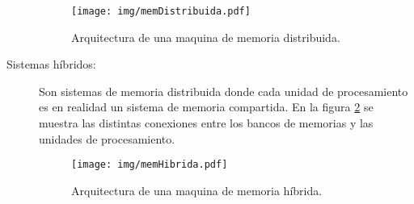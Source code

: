 \begin{description}
\begin{figure}[!htb]

	\centering
	\texttt{[image: img/memDistribuida.pdf]}
	\caption{Arquitectura de una maquina de memoria distribuida.}

	\label{memDistribuida}

\end{figure}


	\item[Sistemas híbridos:] Son sistemas de memoria distribuida donde
		cada unidad de procesamiento es en realidad un sistema de
		memoria compartida. En la figura \ref{memHibrida} se muestra las
		distintas conexiones entre los bancos de memorias y las unidades
		de procesamiento.

\begin{figure}[!htb]

	\centering
	\texttt{[image: img/memHibrida.pdf]}
	\caption{Arquitectura de una maquina de memoria híbrida.}

	\label{memHibrida}

\end{figure}

\end{description}
